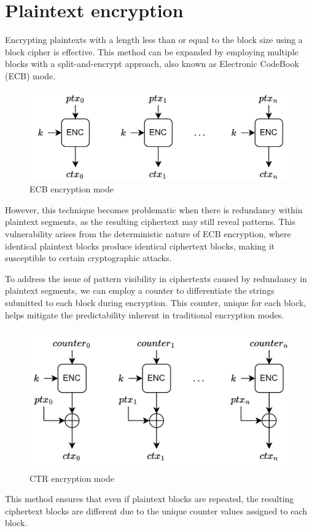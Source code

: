 \section{Plaintext encryption}

Encrypting plaintexts with a length less than or equal to the block size using a block cipher is effective.
This method can be expanded by employing multiple blocks with a split-and-encrypt approach, also known as Electronic CodeBook (ECB) mode.
\begin{figure}[H]
    \centering
    \includegraphics[width=0.75\linewidth]{images/ecb.png}
    \caption{ECB encryption mode}
\end{figure}
However, this technique becomes problematic when there is redundancy within plaintext segments, as the resulting ciphertext may still reveal patterns. 
This vulnerability arises from the deterministic nature of ECB encryption, where identical plaintext blocks produce identical ciphertext blocks, making it susceptible to certain cryptographic attacks.

To address the issue of pattern visibility in ciphertexts caused by redundancy in plaintext segments, we can employ a counter to differentiate the strings submitted to each block during encryption. 
This counter, unique for each block, helps mitigate the predictability inherent in traditional encryption modes.
\begin{figure}[H]
    \centering
    \includegraphics[width=0.75\linewidth]{images/ctr.png}
    \caption{CTR encryption mode}
\end{figure}
This method ensures that even if plaintext blocks are repeated, the resulting ciphertext blocks are different due to the unique counter values assigned to each block.

